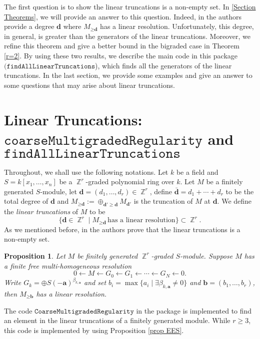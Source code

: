 \documentclass[11pt]{amsart}
\DeclareMathOperator{\Z}{\mathbb{Z}}
\newtheorem{prop}[thm]{Proposition}
\theoremstyle{definition}
\begin{document}
The first question is to show the linear truncations is a non-empty set.  In  \autoref{Section Theorems}, we will provide an answer to this question. Indeed, in  \cite{EisenbudErmanSchreyer}  the authors provide a degree $\textbf{d}$  where $M_{\geq \textbf{d}}$ has a linear resolution. Unfortunately, this degree, in general,  is greater than the generators of the linear truncations. Moreover, we refine this theorem and give a better bound in the bigraded case in Theorem \autoref{r=2}. By using these two results, we describe the main code in this package $(\mathtt{findAllLinearTruncations}$), which finds all the generators of the linear truncations.   In the last section, we provide some examples and give an answer to some questions  that may arise about linear truncations. 

\section{Linear Truncations: \\ $\mathtt{coarseMultigradedRegularity}$ and  $\mathtt{findAllLinearTruncations}$ }\label{Section Theorems}
\noindent Throughout, we shall use the following notations. Let $k$ be a field and $S=k[x_1,\dots ,x_n]$ be a $\Z^r$-graded polynomial ring over $k$. Let $M$ be a finitely generated $S$-module, let $\textbf{d}=(d_1,\dots,d_r)\in \Z^r$, define $\bar{\textbf{d}}=d_1+\cdots +d_r$ to be the total degree of $\textbf{d}$ and  $M_{\geq \textbf{d}}:= \oplus _{\textbf{d}'\geq \textbf{d}} M_{\textbf{d}'}$ is the truncation of $M$ at $\textbf{d}$. 
 We define the \textit{linear truncations} of $M$ to  be 
 $$
 \{ \textbf{d} \in \Z^r \mid M_{\geq \textbf{d}} \,\text{has a linear resolution}\}\subset \Z^r.
 $$
As we mentioned before, in \cite{EisenbudErmanSchreyer} the authors prove that the linear truncations is a non-empty set.
 \begin{prop}\cite[Proposition 1.7 ]{EisenbudErmanSchreyer}\label{prop EES}
 Let $M$ be finitely generated $\Z^r$-graded $S$-module. Suppose $M$ has a finite free multi-homogeneous resolution
 $$
 0\leftarrow M\leftarrow G_0\leftarrow G_1\leftarrow \cdots \leftarrow G_N\leftarrow 0.
 $$
 Write $G_k= \oplus S(-\textbf{a})^{\beta_{k,\textbf{a}}}$ and set $b_i = \max \{ a_i \mid \exists \beta_{k,\textbf{a}}\neq 0 \}$ and $\textbf{b}=(b_1,\dots,b_r)$, then $M_{\geq \textbf{b}}$ has a linear resolution.
 \end{prop}
The code $\mathtt{CoarseMultigradedRegularity}$ in the package is implemented to find an element in the linear truncations of a finitely generated module. While $r\geq 3$, this code is implemented by using  Proposition \autoref{prop EES}.
\end{document}

